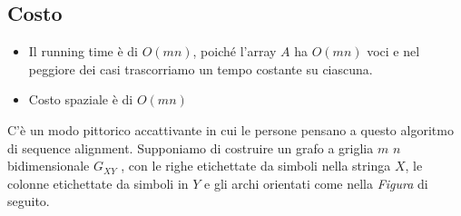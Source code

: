 \subsection{Costo}

\begin{itemize}
	\item
	      Il running time è di $O(mn)$, poiché l'array $A$ ha $O(mn)$ voci
	      e nel peggiore dei casi trascorriamo un tempo costante su ciascuna.
	\item
	      Costo spaziale è di $O(mn)$
\end{itemize}

C'è un modo pittorico accattivante in cui le persone pensano a questo
algoritmo di sequence alignment. Supponiamo di costruire un grafo a
griglia $m$ \times $n$ bidimensionale $G_{XY}$ , con le righe
etichettate da simboli nella stringa $X$, le colonne etichettate da
simboli in $Y$ e gli archi orientati come nella \emph{Figura} di
seguito.

